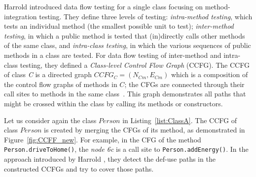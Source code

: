 Harrold \etal \cite{Harrold1994} introduced data flow testing for a single class focusing on method-integration testing. They define three levels of testing: \textit{intra-method testing}, which tests an individual method (\ie the smallest possible unit to test); \textit{inter-method testing}, in which a public method is tested that (in)directly calls other methods of the same class, and \textit{intra-class testing}, in which the various sequences of public methods in a class are tested. For data flow testing of inter-method and intra-class testing, they defined a \textit{Class-level Control Flow Graph} (CCFG). The CCFG of class \textit{C} is a directed graph $CCFG_C=(N_{Cm},E_{Cm})$ which is a composition of the control flow graphs of methods in $C$; the CFGs are connected through their call sites to methods in the same class~\cite{Harrold1994}. This graph demonstrates all paths that might be crossed within the class by calling its methods or constructors. 


Let us consider again the class $Person$ in Listing~\ref{list:ClassA}. The CCFG of class $Person$ is created by merging the CFGs of its method, as demonstrated in Figure~\ref{fig:CCFF_new}.
For example, in the CFG of the method \texttt{Person.driveToHome()}, the \textit{node 6c} is a call site to \texttt{Person.addEnergy()}. In the approach introduced by Harrold \etal \cite{Harrold1994}, they detect the def-use paths in the constructed CCFGs and try to cover those paths.

%
%



